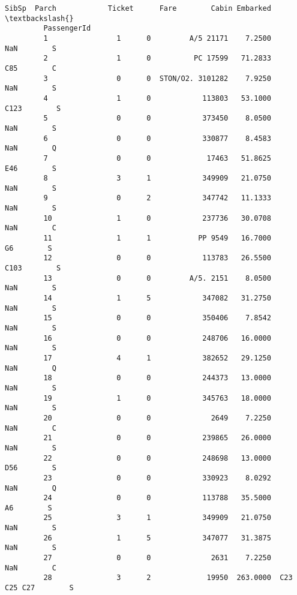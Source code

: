 \documentclass[11pt]{article}
\begin{document}
\begin{Verbatim}[commandchars=\\\{\}]
                      SibSp  Parch            Ticket      Fare        Cabin Embarked  \textbackslash{}
         PassengerId                                                                   
         1                1      0         A/5 21171    7.2500          NaN        S   
         2                1      0          PC 17599   71.2833          C85        C   
         3                0      0  STON/O2. 3101282    7.9250          NaN        S   
         4                1      0            113803   53.1000         C123        S   
         5                0      0            373450    8.0500          NaN        S   
         6                0      0            330877    8.4583          NaN        Q   
         7                0      0             17463   51.8625          E46        S   
         8                3      1            349909   21.0750          NaN        S   
         9                0      2            347742   11.1333          NaN        S   
         10               1      0            237736   30.0708          NaN        C   
         11               1      1           PP 9549   16.7000           G6        S   
         12               0      0            113783   26.5500         C103        S   
         13               0      0         A/5. 2151    8.0500          NaN        S   
         14               1      5            347082   31.2750          NaN        S   
         15               0      0            350406    7.8542          NaN        S   
         16               0      0            248706   16.0000          NaN        S   
         17               4      1            382652   29.1250          NaN        Q   
         18               0      0            244373   13.0000          NaN        S   
         19               1      0            345763   18.0000          NaN        S   
         20               0      0              2649    7.2250          NaN        C   
         21               0      0            239865   26.0000          NaN        S   
         22               0      0            248698   13.0000          D56        S   
         23               0      0            330923    8.0292          NaN        Q   
         24               0      0            113788   35.5000           A6        S   
         25               3      1            349909   21.0750          NaN        S   
         26               1      5            347077   31.3875          NaN        S   
         27               0      0              2631    7.2250          NaN        C   
         28               3      2             19950  263.0000  C23 C25 C27        S   

\end{Verbatim}
\end{document}
